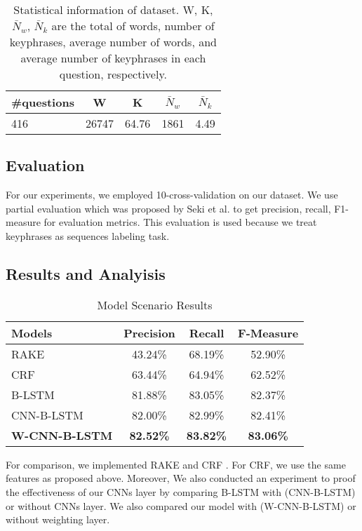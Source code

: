 \documentclass[sigconf]{acmart}
\begin{document}
	\begin{table}
		\caption{Statistical information of dataset. W, K, $\bar{N}_{w}$, $\bar{N}_{k}$ are the total of words, number of keyphrases, average number of words, and average number of keyphrases in each question, respectively.}
		\label{tab:descriptive_stats}
		\begin{tabular}{lcccc}
			\toprule
			\#questions&W&K&$\bar{N}_{w}$&$\bar{N}_{k}$\\
			\midrule
			416 & 26747  & 64.76 & 1861 & 4.49 \\
			
			\bottomrule
		\end{tabular}
	\end{table}
	\subsection{Evaluation}
	For our experiments, we employed 10-cross-validation on our dataset. We use partial evaluation which was proposed by Seki et al. \cite{seki2003probabilistic} to get precision, recall, F1-measure for evaluation metrics. This evaluation is used because we treat keyphrases as sequences labeling task.  
	
	\subsection{Results and Analyisis}
	\begin{table}
		\caption{Model Scenario Results}
		\label{tab:model_scenario}
		\begin{tabular}{lccc}
			\toprule
			Models&Precision&Recall&F-Measure\\
			\midrule
			RAKE & 43.24\% & 68.19\% & 52.90\% \\
			
			CRF & 63.44\% & 64.94\% & 62.52\% \\
			\midrule
			B-LSTM & 81.88\% & 83.05\% & 82.37\% \\
			
			CNN-B-LSTM & 82.00\% & 82.99\% & 82.41\% \\
			
			\textbf{W-CNN-B-LSTM} & \textbf{82.52\%} & \textbf{83.82\%} & \textbf{83.06\%} \\
			\bottomrule
		\end{tabular}
	\end{table}
	
	
	For comparison, we implemented RAKE \cite{rake} and CRF \cite{cao2010automatically}. For CRF, we use the same features as proposed above. Moreover, We also conducted an experiment to proof the effectiveness of our CNNs layer by comparing B-LSTM with (CNN-B-LSTM) or without CNNs layer. We also compared our model with (W-CNN-B-LSTM) or without weighting layer.
	
\end{document}

